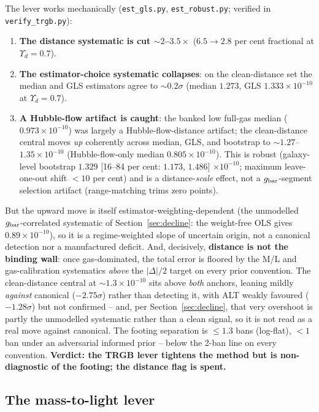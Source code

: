 \documentclass[fleqn,usenatbib]{mnras}
\begin{document}
The lever works mechanically (\texttt{est\_gls.py}, \texttt{est\_robust.py}; verified in \texttt{verify\_trgb.py}):
\begin{enumerate}
\item \textbf{The distance systematic is cut ${\sim}2$--$3.5\times$} ($6.5\to2.8$ per cent fractional at $\Upsilon_d=0.7$).
\item \textbf{The estimator-choice systematic collapses}: on the clean-distance set the median and GLS estimators agree to ${\sim}0.2\sigma$ (median $1.273$, GLS $1.333\times10^{-10}$ at $\Upsilon_d=0.7$).
\item \textbf{A Hubble-flow artifact is caught}: the banked low full-gas median ($0.973\times10^{-10}$) was largely a Hubble-flow-distance artifact; the clean-distance central moves \emph{up} coherently across median, GLS, and bootstrap to ${\sim}1.27$--$1.35\times10^{-10}$ (Hubble-flow-only median $0.805\times10^{-10}$). This is robust (galaxy-level bootstrap $1.329$ [16--84 per cent: $1.173$, $1.486$] $\times10^{-10}$; maximum leave-one-out shift $<10$ per cent) and is a distance-\emph{scale} effect, not a $g_{\rm bar}$-segment selection artifact (range-matching trims zero points).
\end{enumerate}

But the upward move is itself estimator-weighting-dependent (the unmodelled $g_{\rm bar}$-correlated systematic of Section~\ref{sec:decline}: the weight-free OLS gives $0.89\times10^{-10}$), so it is a regime-weighted slope of uncertain origin, not a canonical detection nor a manufactured deficit. And, decisively, \textbf{distance is not the binding wall}: once gas-dominated, the total error is floored by the M/L and gas-calibration systematics \emph{above} the $|\Delta|/2$ target on every prior convention. The clean-distance central at ${\sim}1.3\times10^{-10}$ sits above \emph{both} anchors, leaning mildly \emph{against} canonical ($-2.75\sigma$) rather than detecting it, with ALT weakly favoured ($-1.28\sigma$) but not confirmed -- and, per Section~\ref{sec:decline}, that very overshoot is partly the unmodelled systematic rather than a clean signal, so it is not read as a real move against canonical. The footing separation is $\le1.3$ bans (log-flat), $<1$ ban under an adversarial informed prior -- below the 2-ban line on every convention. \textbf{Verdict: the TRGB lever tightens the method but is non-diagnostic of the footing; the distance flag is spent.}

\subsection{The mass-to-light lever}
\label{sec:mllever}
\end{document}
